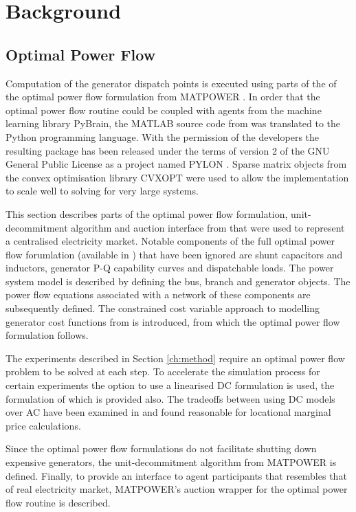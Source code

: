 \chapter{Background}

\section{Optimal Power Flow}
\label{sec:opf}
Computation of the generator dispatch points is executed using parts of the
of the optimal power flow formulation from MATPOWER \cite{zimmerman:mp_pes}.
In order that the optimal power flow routine could be coupled with agents from
the machine learning library PyBrain, the
MATLAB\textsuperscript{\texttrademark} source code from \matpower was
translated to the Python programming language.  With the permission of the
\matpower developers the resulting package has been released under the terms of
version 2 of the GNU General Public License as a project named
PYLON \cite{lincoln:pyreto}. Sparse matrix objects from the convex
optimisation library CVXOPT were used to allow the implementation to scale well to solving for very large systems.

This section describes parts of the optimal power flow formulation,
unit-decommitment algorithm and auction interface from \matpower that were used
to represent a centralised electricity market.  Notable components of the full
optimal power flow forumlation (available in \cite{pserc:mp_manual}) that have
been ignored are shunt capacitors and inductors, generator P-Q capability
curves and dispatchable loads. The power system model is described by defining
the bus, branch and generator objects.  The power flow equations associated with a network of these components are subsequently defined. The constrained cost variable approach to modelling generator cost
functions from \cite{zimmerman:ccv} is introduced, from which the optimal power
flow formulation follows.

The experiments described in Section \ref{ch:method} require an optimal power
flow problem to be solved at each step.  To accelerate the simulation process
for certain experiments the option to use a linearised DC formulation is used,
the formulation of which is provided also.  The tradeoffs between using DC
models over AC have been examined in \cite{overbye:acdc} and found reasonable
for locational marginal price calculations.

Since the optimal power flow formulations do not facilitate shutting down
expensive generators, the unit-decommitment algorithm from MATPOWER is defined.
Finally, to provide an interface to agent participants that resembles that of
real electricity market, MATPOWER's auction wrapper for the optimal power flow
routine is described.

